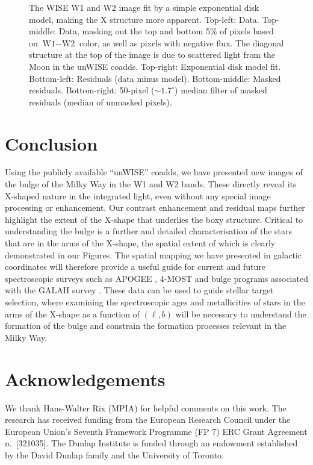 \documentclass[12pt, preprint]{aastex}
\begin{document}
\begin{figure}[h!]
\caption{%
  The WISE W1 and W2 image fit by a simple exponential disk
  model, making the X structure more apparent.
  Top-left: Data.  Top-middle: Data, masking out the top and bottom 5\%
  of pixels based on $\textrm{W1} - \textrm{W2}$ color, as well as pixels with negative flux.  The diagonal structure
  at the top of the image is due to scattered light from the Moon in the unWISE coadds.
  Top-right: Exponential disk model fit.
  Bottom-left: Residuals (data minus model).  Bottom-middle: Masked residuals.
  Bottom-right: 50-pixel ($\sim 1.7^{\circ}$) median filter of masked residuals (median of unmasked
  pixels).
  }
\label{fig:modfit}
\end{figure}




\section{Conclusion}

Using the publicly available ``unWISE'' coadds, we have presented new images of the bulge of the Milky Way in the W1 and W2 bands.  These directly reveal its X-shaped nature in the integrated light, even without any special image processing or enhancement. Our contrast enhancement and residual maps further highlight the extent of the X-shape that underlies the boxy structure. Critical to understanding the bulge is a further and detailed characterisation of the stars that are in the arms of the X-shape, the spatial extent of which is clearly demonstrated in our Figures. The spatial mapping we have presented in galactic coordinates will therefore provide a useful guide for current and future spectroscopic surveys such as APOGEE \citep{Majewski2015}, 4-MOST \citep{4most} and bulge programs associated with the GALAH survey \citep{deSilva2015}. These data can be used to guide stellar target selection, where examining the spectroscopic ages \citep[e.g.][]{Martig2016, Ness2016} and metallicities of stars in the arms of the X-shape as a function of $(\ell,b)$ will be necessary to understand the formation of the bulge and constrain the formation processes relevant in the Milky Way. 


\section{Acknowledgements} 
We thank Hans-Walter Rix (MPIA) for helpful comments on this work. 
The research has received funding from the European Research Council under the European Union's Seventh Framework Programme (FP 7) ERC Grant Agreement n.~[321035].
%
The Dunlap Institute is funded through an endowment established by the David Dunlap family and the University of Toronto.
\end{document}

